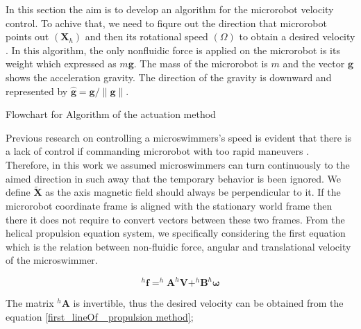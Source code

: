 \documentclass[12pt,a4paper,titlepage]{report}
\begin{document}


In this section the aim is to develop an algorithm for the microrobot velocity control. To achive that, we need to 
fiqure out the direction that microrobot points out $(\bm{X}_{h})$ and then its rotational speed $(\Omega)$
 to obtain a desired velocity \cite{mahoney2011velocity}.
In this algorithm, the only nonfluidic force is applied on the microrobot is its weight which expressed as 
$m\bm{g}$. The mass of the microrobot is $m$ and the vector $\bm{g}$ shows the acceleration gravity. 
The direction of the gravity is downward and represented by $\hat{ \bm{g} }= \bm{g}/ \| \bm{g}\|$.






Flowchart for Algorithm of the actuation method


Previous research on controlling a microswimmers\rq{}s speed is evident that there is a lack
of control if commanding microrobot with too rapid maneuvers \citep{zhang2009characterizing} \citep{zhang2009artificial}
. Therefore, in this work we assumed
microswimmers can turn continuously to the aimed direction in such away that the temporary behavior is been
ignored. We define $\tilde{\bm{X}}$ as the axis magnetic field should always be perpendicular to it.
If the microrobot coordinate frame is aligned with the stationary world frame then there it does not require
to convert vectors between these two frames. From the helical propulsion equation system, 
we specifically considering the first equation which is the relation between non-fluidic force, angular and 
translational velocity of the microswimmer. 



\begin{equation}
^{h}\bm{f} = ^{h}\bm{A} ^{h}\bm{V} + ^{h}\bm{B} ^{h}\bm{\omega}
\label{first_lineOf_ propulsion method}
\end{equation}

The matrix $^{h}\bm{A}$ is invertible, thus the desired velocity can be obtained from the
 equation \ref{first_lineOf_ propulsion method};
\end{document}
